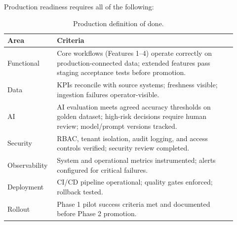 \documentclass[11pt,a4paper]{article}
\begin{document}
Production readiness requires all of the following:

\begin{table}[H]
\centering
\small
\begin{tabular}{p{0.18\linewidth}p{0.74\linewidth}}
\toprule
\textbf{Area} & \textbf{Criteria} \\
\midrule
Functional  & Core workflows (Features 1–4) operate correctly on production-connected data; extended features pass staging acceptance tests before promotion. \\
Data        & KPIs reconcile with source systems; freshness visible; ingestion failures operator-visible. \\
AI          & AI evaluation meets agreed accuracy thresholds on golden dataset; high-risk decisions require human review; model/prompt versions tracked. \\
Security    & RBAC, tenant isolation, audit logging, and access controls verified; security review completed. \\
Observability & System and operational metrics instrumented; alerts configured for critical failures. \\
Deployment  & CI/CD pipeline operational; quality gates enforced; rollback tested. \\
Rollout     & Phase 1 pilot success criteria met and documented before Phase 2 promotion. \\
\bottomrule
\end{tabular}
\caption{Production definition of done.}
\end{table}
\end{document}
